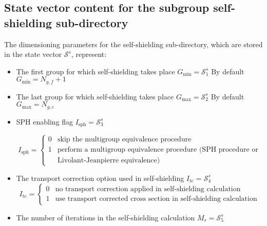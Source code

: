\begin{itemize}
\end{itemize}

\subsection{State vector content for the subgroup self-shielding sub-directory}\label{sect:sssubgroupstate}

The dimensioning parameters for the self-shielding sub-directory, which are stored in the state vector
$\mathcal{S}^{s}$, represent:

\begin{itemize}
\item The first group for which self-shielding takes place $G_{\mathrm{min}}=\mathcal{S}^{s}_{1}$
       By default $G_{\mathrm{min}}=N_{g,f}+1$

\item The last group for which self-shielding takes place $G_{\mathrm{max}}=\mathcal{S}^{s}_{2}$
       By default $G_{\mathrm{max}}=N_{g,e}$
       
\item SPH enabling flag $I_{\mathrm{sph}}=\mathcal{S}^{s}_{3}$ 

\begin{displaymath}
I_{\mathrm{sph}} = \left\{
\begin{array}{ll}
0 & \textrm{skip the multigroup equivalence procedure} \\
1 & \textrm{perform a multigroup equivalence procedure (SPH procedure or} \\
  & \textrm{Livolant-Jeanpierre equivalence)}
\end{array} \right.
\end{displaymath}

\item The transport correction option used in self-shielding $I_{\mathrm{tc}}=\mathcal{S}^{s}_{4}$ 
\begin{displaymath}
I_{\mathrm{tc}} = \left\{
\begin{array}{ll}
0 & \textrm{no transport correction applied in self-shielding calculation} \\
1 & \textrm{use transport corrected cross section in self-shielding calculation}
\end{array} \right.
\end{displaymath}

\item The number of iterations in the self-shielding calculation $M_{r}=\mathcal{S}^{s}_{5}$ 


\end{itemize}
